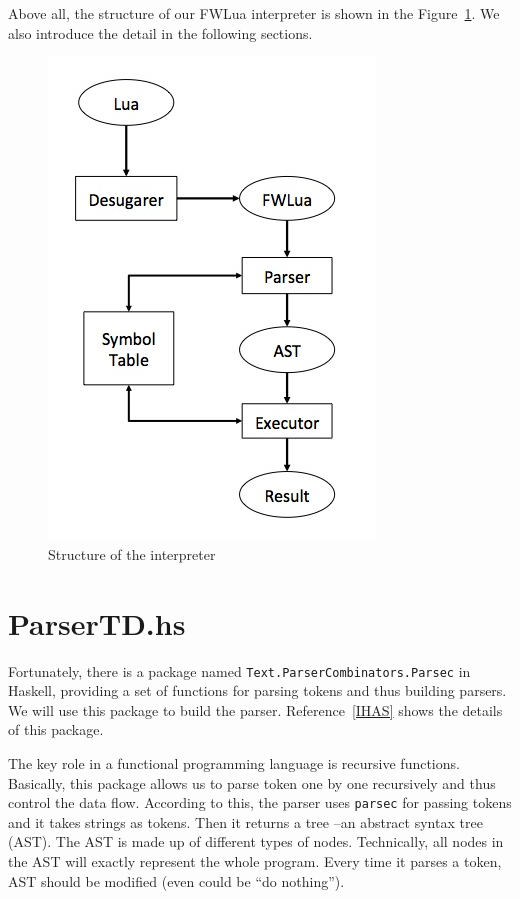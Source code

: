Above all, the structure of our FWLua interpreter is shown in the Figure~\ref {fig:structure}. We also introduce the detail in the following sections. 

\begin{figure}
\centering
\caption{Structure of the interpreter}
\label{fig:structure}
\includegraphics[scale = 0.9]{Interpreter}
\end{figure}

\section{ParserTD.hs}
Fortunately, there is a package named {\tt Text.ParserCombinators.Parsec} in Haskell, providing a set of functions for parsing tokens and thus building parsers. We will use this package to build the parser. Reference~\ref{IHAS} shows the details of this package.

The key role in a functional programming language is recursive functions. Basically, this package allows us to parse token one by one recursively and thus control the data flow. According to this, the parser uses {\tt parsec} for passing tokens and it takes strings as tokens. Then it returns a tree --an abstract syntax tree (AST).
The AST is made up of different types of nodes.
Technically, all nodes in the AST will exactly represent the whole program. Every time it parses a token, AST should be modified (even could be ``do nothing'').

